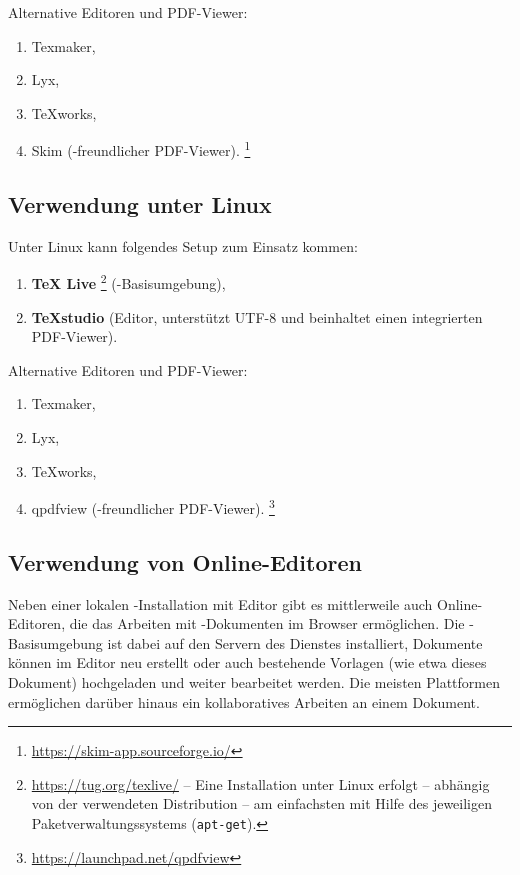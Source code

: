 Alternative Editoren und PDF-Viewer:
%
\begin{enumerate}
	\item Texmaker,%
	\item Lyx,%
	\item TeXworks,%
	\item Skim (\latex-freundlicher PDF-Viewer).%
	\footnote{\url{https://skim-app.sourceforge.io/}}
\end{enumerate}

\subsection{Verwendung unter Linux}

Unter Linux kann folgendes Setup zum Einsatz kommen:
%
\begin{enumerate}
	\item 
	\textbf{TeX Live}%
	\footnote{\url{https://tug.org/texlive/} -- Eine Installation unter Linux erfolgt -- abhängig von der verwendeten
	Distribution -- am einfachsten mit Hilfe des jeweiligen Paketverwaltungssystems (\zB \texttt{apt-get}).}
	(\latex-Basisumgebung),
	\item \textbf{TeXstudio}%
	(Editor, unterstützt UTF-8 und beinhaltet einen integrierten PDF-Viewer).
\end{enumerate}

Alternative Editoren und PDF-Viewer:
%
\begin{enumerate}
	\item Texmaker,%
	\item Lyx,%
	\item TeXworks,%
	\item qpdfview (\latex-freundlicher PDF-Viewer).%
	\footnote{\url{https://launchpad.net/qpdfview}}
\end{enumerate}

\subsection{Verwendung von Online-Editoren}

Neben einer lokalen \latex-Installation mit Editor gibt es mittlerweile auch Online-Editoren, die das Arbeiten mit \latex-Dokumenten
im Browser ermöglichen. Die \latex-Basisumgebung ist dabei auf den Servern des Dienstes installiert, Dokumente können im Editor neu
erstellt oder auch bestehende Vorlagen (wie etwa dieses Dokument) hochgeladen und weiter bearbeitet werden. Die meisten Plattformen
ermöglichen darüber hinaus ein kollaboratives Arbeiten an einem Dokument.

